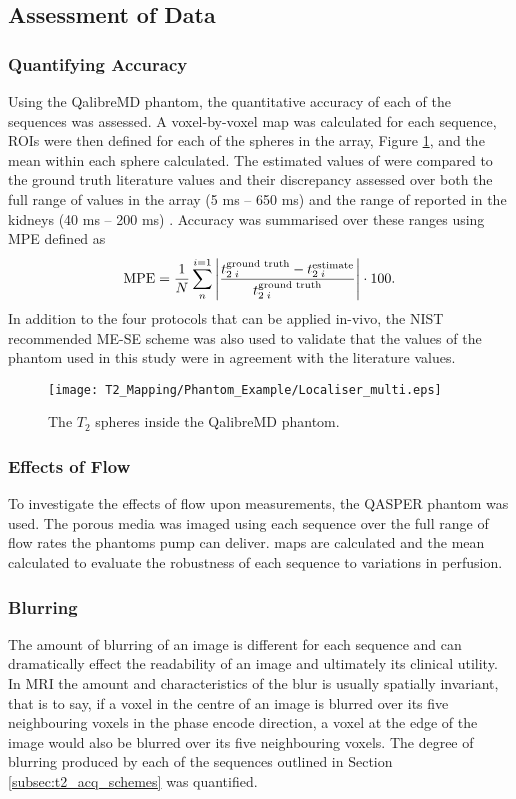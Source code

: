 \subsection{Assessment of Data}

\subsubsection{Quantifying Accuracy}
Using the QalibreMD phantom, the quantitative accuracy of each of the sequences was assessed. A voxel-by-voxel \ttwo map was calculated for each sequence, \acp{ROI} were then defined for each of the spheres in the \ttwo array, Figure \ref{fig:t2_phantom_loc}, and the mean \ttwo within each sphere calculated. The estimated values of \ttwo were compared to the ground truth literature values and their discrepancy assessed over both the full range of \ttwo values in the array (5 ms – 650 ms) and the range of \ttwo reported in the kidneys (40 ms – 200 ms) \cite{wolf_magnetic_2018}. Accuracy was summarised over these ranges using \ac{MPE} defined as 
\begin{equation}
	\textup{MPE} = \frac{1}{N}\sum_{n}^{i=1}\left|  \frac{t_{2\; i}^{\textup{ground truth}} - t_{2\; i}^{\textup{estimate}}}{t_{2\; i}^{\textup{ground truth}}}\right| \cdot 100.
	\label{eq:t2_MPE}
\end{equation}
In addition to the four protocols that can be applied in-vivo, the \ac{NIST} recommended ME-SE scheme was also used to validate that the \ttwo values of the phantom used in this study were in agreement with the literature values.

\begin{figure}[H]
	\centering
	\texttt{[image: T2\_Mapping/Phantom\_Example/Localiser\_multi.eps]}
	\caption{The $T_2$ spheres inside the QalibreMD phantom.}
	\label{fig:t2_phantom_loc}	
\end{figure}

\subsubsection{Effects of Flow}
To investigate the effects of flow upon \ttwo measurements, the \ac{QASPER} phantom was used. The porous media was imaged using each sequence over the full range of flow rates the phantoms pump can deliver. \ttwo maps are calculated and the mean \ttwo calculated to evaluate the robustness of each sequence to variations in perfusion.

\subsubsection{Blurring}
The amount of blurring of an image is different for each sequence and can dramatically effect the readability of an image and ultimately its clinical utility. In \ac{MRI} the amount and characteristics of the blur is usually spatially invariant, that is to say, if a voxel in the centre of an image is blurred over its five neighbouring voxels in the phase encode direction, a voxel at the edge of the image would also be blurred over its five neighbouring voxels. The degree of blurring produced by each of the sequences outlined in Section \ref{subsec:t2_acq_schemes} was quantified.

